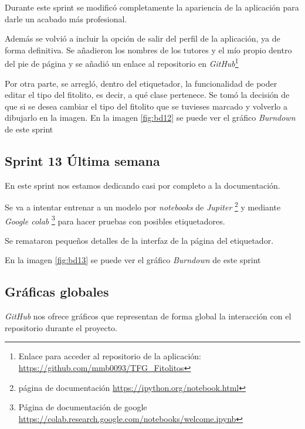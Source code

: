 Durante este sprint se modificó completamente la apariencia de la aplicación para darle un acabado más profesional.

Además se volvió a incluir la opción de salir del perfil de la aplicación, ya de forma definitiva.
Se añadieron los nombres de los tutores y el mío propio dentro del pie de página y se añadió un enlace al repositorio en \textit{GitHub}\footnote{Enlace para acceder al repositorio de la aplicación: \url{https://github.com/mmb0093/TFG_Fitolitos}}

Por otra parte, se arregló, dentro del etiquetador, la funcionalidad de poder editar el tipo del fitolito, es decir, a qué clase pertenece. Se tomó la decisión de que si se desea cambiar el tipo del fitolito que se tuvieses marcado y  volverlo a dibujarlo en la imagen.
En la imagen \ref{fig:bd12} se puede ver el gráfico \textit{Burndown} de este sprint
\subsection{Sprint 13 Última semana}

En este sprint nos estamos dedicando casi por completo a la documentación.

Se va a intentar entrenar a un modelo por \textit{notebooks} de \textit{Jupiter} \footnote{página de documentación \url{https://ipython.org/notebook.html}} y mediante \textit{Google colab} \footnote{Página de documentación de google \url{https://colab.research.google.com/notebooks/welcome.ipynb}} para hacer pruebas con posibles etiquetadores.

Se remataron pequeños detalles de la interfaz de la página del etiquetador.

En la imagen \ref{fig:bd13} se puede ver el gráfico \textit{Burndown} de este sprint

\subsection{Gráficas globales}

\textit{GitHub} nos ofrece gráficos que representan de forma global la interacción con el repositorio durante el proyecto. 

